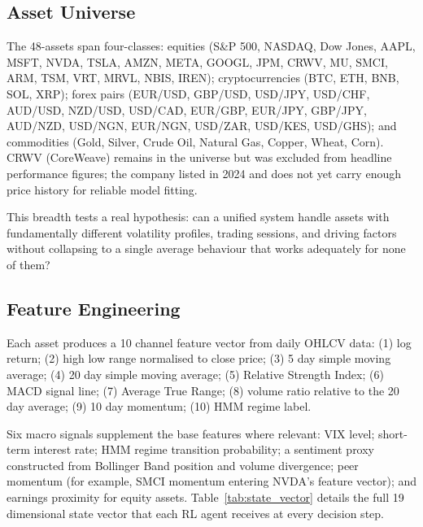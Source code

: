 \documentclass[journal]{IEEEtran}
\begin{document}
\subsection{Asset Universe}

The 48-assets span four-classes: equities (S\&P 500, NASDAQ, Dow Jones,
AAPL, MSFT, NVDA, TSLA, AMZN, META, GOOGL, JPM, CRWV, MU, SMCI, ARM,
TSM, VRT, MRVL, NBIS, IREN); cryptocurrencies (BTC, ETH, BNB, SOL, XRP);
forex pairs (EUR/USD, GBP/USD, USD/JPY, USD/CHF, AUD/USD, NZD/USD,
USD/CAD, EUR/GBP, EUR/JPY, GBP/JPY, AUD/NZD, USD/NGN, EUR/NGN, USD/ZAR,
USD/KES, USD/GHS); and commodities (Gold, Silver, Crude Oil, Natural Gas,
Copper, Wheat, Corn). CRWV (CoreWeave) remains in the universe but was
excluded from headline performance figures; the company listed in 2024
and does not yet carry enough price history for reliable model fitting.

This breadth tests a real hypothesis: can a unified system handle assets
with fundamentally different volatility profiles, trading sessions, and
driving factors without collapsing to a single average behaviour that
works adequately for none of them?

\subsection{Feature Engineering}

Each asset produces a 10 channel feature vector from daily OHLCV data:
(1) log return; (2) high low range normalised to close price; (3) 5 day
simple moving average; (4) 20 day simple moving average; (5) Relative
Strength Index; (6) MACD signal line; (7) Average True Range; (8) volume
ratio relative to the 20 day average; (9) 10 day momentum; (10) HMM
regime label.

Six macro signals supplement the base features where relevant: VIX level;
short-term interest rate; HMM regime transition probability; a sentiment
proxy constructed from Bollinger Band position and volume divergence; peer
momentum (for example, SMCI momentum entering NVDA's feature vector); and
earnings proximity for equity assets. Table~\ref{tab:state_vector} details
the full 19 dimensional state vector that each RL agent receives at
every decision step.
\end{document}
